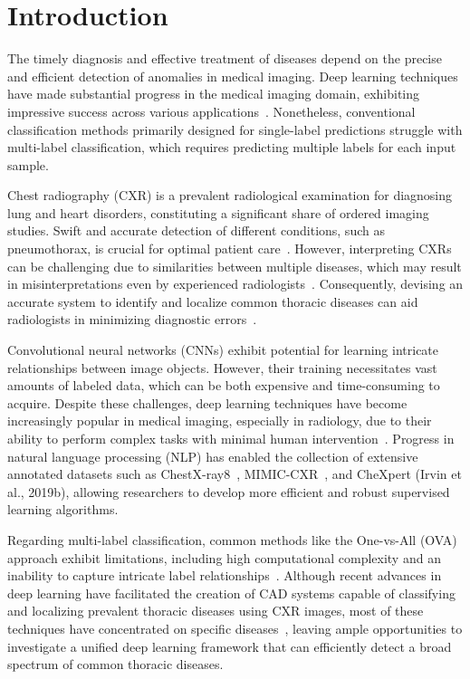 \section{Introduction}

The timely diagnosis and effective treatment of diseases depend on the precise and efficient detection of anomalies in medical imaging. Deep learning techniques have made substantial progress in the medical imaging domain, exhibiting impressive success across various applications~\cite{litjens_Survey_2017a,eshghali_Machine_2023}. Nonetheless, conventional classification methods primarily designed for single-label predictions struggle with multi-label classification, which requires predicting multiple labels for each input sample.

Chest radiography (CXR) is a prevalent radiological examination for diagnosing lung and heart disorders, constituting a significant share of ordered imaging studies. Swift and accurate detection of different conditions, such as pneumothorax, is crucial for optimal patient care~\cite{bellaviti_Increased_2016}. However, interpreting CXRs can be challenging due to similarities between multiple diseases, which may result in misinterpretations even by experienced radiologists~\cite{delrue_Difficulties_2011}. Consequently, devising an accurate system to identify and localize common thoracic diseases can aid radiologists in minimizing diagnostic errors~\cite{crisp_Global_2014,silverstein_Most_2016}.

Convolutional neural networks (CNNs) exhibit potential for learning intricate relationships between image objects. However, their training necessitates vast amounts of labeled data, which can be both expensive and time-consuming to acquire. Despite these challenges, deep learning techniques have become increasingly popular in medical imaging, especially in radiology, due to their ability to perform complex tasks with minimal human intervention~\cite{jaderberg_Spatial_2015}. Progress in natural language processing (NLP) has enabled the collection of extensive annotated datasets such as ChestX-ray8~\cite{wang_ChestXRay8_2017}, MIMIC-CXR~\cite{johnson_MIMICCXR_2019}, and CheXpert (Irvin et al., 2019b), allowing researchers to develop more efficient and robust supervised learning algorithms.

Regarding multi-label classification, common methods like the One-vs-All (OVA) approach exhibit limitations, including high computational complexity and an inability to capture intricate label relationships~\cite{tsoumakas_MultiLabel_2007}. Although recent advances in deep learning have facilitated the creation of CAD systems capable of classifying and localizing prevalent thoracic diseases using CXR images, most of these techniques have concentrated on specific diseases~\cite{jaiswal_Identifying_2019,lakhani_Deep_2017,pasa_Efficient_2019,ausawalaithong_Automatic_2018}, leaving ample opportunities to investigate a unified deep learning framework that can efficiently detect a broad spectrum of common thoracic diseases.

